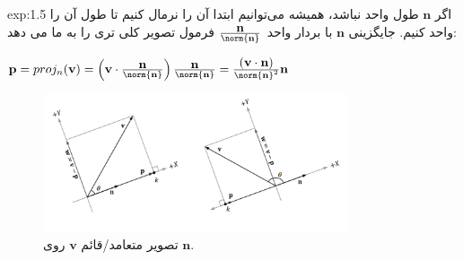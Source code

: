 {\begin{spacing}{1.5}
\begin{example}{exp:1.5}
            اگر $\textbf{n}$ طول واحد نباشد، همیشه می‌توانیم ابتدا آن را نرمال کنیم تا طول آن را واحد کنیم.
            جایگزینی $\textbf{n}$ با بردار واحد $\frac{\displaystyle\textbf{n}}{\norm{\textbf{n}}}$ فرمول تصویر کلی تری را به ما می دهد:

            \begin{center}
                $\textbf{p}=proj_{n}(\textbf{v})=\left( \textbf{v}\cdot\frac{\displaystyle\textbf{n}}{\norm{\textbf{n}}} \right)\frac{\displaystyle\textbf{n}}{\norm{\textbf{n}}}=\frac{\displaystyle(\textbf{v}\cdot\textbf{n})}{\norm{\textbf{n}}^2}\textbf{n}$
            \end{center}

            \begin{figure}[H]
                \centering
                \setlength{\belowcaptionskip}{-10pt}
                \includegraphics[width=0.8\textwidth]{Images/4/1/4.Session.1.1.10}
                \caption{تصویر متعامد/قائم $\textbf{v}$ روی $\textbf{n}$. \textbf{\vspace{10pt}}}
                \label{fig:4.Session.1.1.10}
            \end{figure}
        \end{example}
    \end{spacing}
}

\textbf{\vspace{-10pt}}

